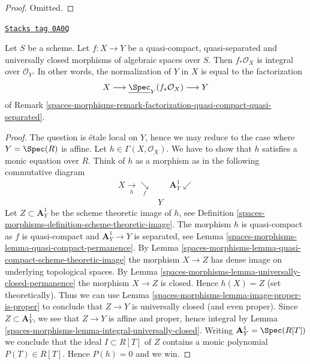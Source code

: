 \begin{proof}
Omitted.
\end{proof}

\begin{lemma}
\label{spaces-morphisms-lemma-normalization-in-universally-closed}
\href{https://stacks.math.columbia.edu/tag/0A0Q}{\texttt{Stacks tag 0A0Q}}

Let $S$ be a scheme.
Let $f : X \to Y$ be a quasi-compact, quasi-separated and
universally closed morphisms of algebraic spaces over $S$.
Then $f_*\mathcal{O}_X$ is integral over $\mathcal{O}_Y$. In other
words, the normalization of $Y$ in $X$ is equal to the factorization
$$
X \longrightarrow \underline{\Spec}_Y(f_*\mathcal{O}_X)
\longrightarrow Y
$$
of Remark \ref{spaces-morphisms-remark-factorization-quasi-compact-quasi-separated}.
\end{lemma}

\begin{proof}
The question is \'etale local on $Y$, hence we may reduce to the
case where $Y = \Spec(R)$ is affine. Let $h \in \Gamma(X, \mathcal{O}_X)$.
We have to show that $h$ satisfies a monic equation over $R$. Think of $h$
as a morphism as in the following commutative diagram
$$
\begin{array}{ccc}X \underset{h}{\longrightarrow}\underset{f}{\searrow} &  & \mathbf{A}^1_Y \swarrow \\  & Y & \end{array}
$$
Let $Z \subset \mathbf{A}^1_Y$ be the scheme theoretic image of $h$,
see Definition \ref{spaces-morphisms-definition-scheme-theoretic-image}.
The morphism $h$ is quasi-compact as $f$ is quasi-compact and
$\mathbf{A}^1_Y \to Y$ is separated, see
Lemma \ref{spaces-morphisms-lemma-quasi-compact-permanence}.
By Lemma \ref{spaces-morphisms-lemma-quasi-compact-scheme-theoretic-image} the
morphism $X \to Z$ has dense image on underlying topological spaces. By
Lemma \ref{spaces-morphisms-lemma-universally-closed-permanence} the morphism
$X \to Z$ is closed. Hence $h(X) = Z$ (set theoretically).
Thus we can use
Lemma \ref{spaces-morphisms-lemma-image-proper-is-proper}
to conclude that $Z \to Y$ is universally closed (and even proper).
Since $Z \subset \mathbf{A}^1_Y$, we see that $Z \to Y$ is affine
and proper, hence integral by Lemma \ref{spaces-morphisms-lemma-integral-universally-closed}.
Writing $\mathbf{A}^1_Y = \Spec(R[T])$ we conclude that
the ideal $I \subset R[T]$ of $Z$ contains a monic polynomial
$P(T) \in R[T]$. Hence $P(h) = 0$ and we win.
\end{proof}

